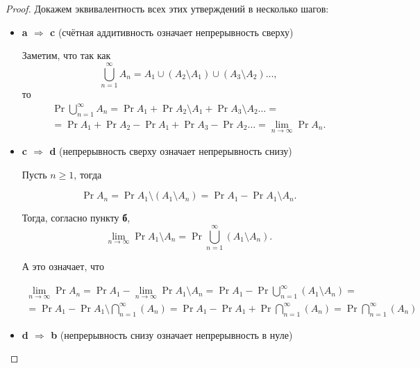 \begin{proof}
    Докажем эквивалентность всех этих утверждений в несколько шагов:

    \begin{itemize}
        \item \textbf{a $\Rightarrow$ c} (счётная аддитивность означает непрерывность сверху)

            Заметим, что так как
            \[
                \bigcup\limits_{n = 1}^{\infty} A_n = A_1 \cup (A_2\setminus A_1) \cup (A_3\setminus A_2)\ldots,
            \]
            то
            \begin{multline*}
                \Pr{\bigcup\limits_{n = 1}^{\infty} A_n} =
                \Pr{A_1} + \Pr{A_2\setminus A_1} + \Pr{A_3\setminus A_2}\ldots =\\=
                \Pr{A_1} + \Pr{A_2} - \Pr{A_1} + \Pr{A_3} -\Pr{A_2}\ldots =
                \lim\limits_{n \to \infty} \Pr{A_n}.
            \end{multline*}

        \item \textbf{c $\Rightarrow$ d} (непрерывность сверху означает непрерывность снизу)

            Пусть $n \geq 1$, тогда

            \[
                \Pr{A_n} = \Pr{A_1 \setminus(A_1\setminus A_n)} = \Pr{A_1} - \Pr{A_1\setminus A_n}.
            \]

            Тогда, согласно пункту \textbf{б},
            \[
                \lim\limits_{n \to \infty}\Pr{A_1\setminus A_n} =
                \Pr{\bigcup\limits_{n=1}^{\infty}(A_1\setminus A_n)}.
            \]

            А это означает, что

            \begin{multline*}
                \lim\limits_{n \to \infty} \Pr{A_n} =
                \Pr{A_1} - \lim\limits_{n \to \infty}\Pr{A_1\setminus A_n} =
                \Pr{A_1} - \Pr{\bigcup\limits_{n=1}^{\infty}(A_1\setminus A_n)} =\\=
                \Pr{A_1} - \Pr{A_1 \setminus \bigcap\limits_{n=1}^{\infty}(A_n)} =
                \Pr{A_1} - \Pr{A_1} + \Pr{\bigcap\limits_{n=1}^{\infty}(A_n)} =
                \Pr{\bigcap\limits_{n=1}^{\infty}(A_n)}
            \end{multline*}

        \item \textbf{d $\Rightarrow$ b} (непрерывность снизу означает непрерывность в нуле)


\end{itemize}
\end{proof}
